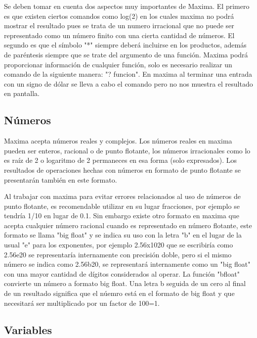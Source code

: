 \documentclass{article} %
\begin{document}
\vspace{0.5 cm}

Se deben tomar en cuenta dos aspectos muy importantes de Maxima. El primero es que existen ciertos comandos como log(2) en los cuales maxima no podrá mostrar el resultado pues se trata de un numero irracional que no puede ser representado como un número finito con una cierta cantidad de números. El segundo es que el símbolo "*" siempre deberá incluirse en los productos, además de paréntesis siempre que se trate del argumento de una función. Maxima podrá proporcionar información de cualquier función, solo es necesario realizar un comando de la siguiente manera: "? funcion". En maxima al terminar una entrada con un signo de dólar se lleva a cabo el comando pero no nos muestra el resultado en pantalla. 

\subsection{Números}

Maxima acepta números reales y complejos. Los números reales en maxima pueden ser enteros, racional o de punto flotante, los números irracionales como lo es raíz de 2 o logaritmo de 2 permaneces en esa forma (solo expresados). Los resultados de operaciones hechas con números en formato de punto flotante se presentarán también en este formato. 

\vspace{0.5 cm}

Al trabajar con maxima para evitar errores relacionados al uso de números de punto flotante, es recomendable utilizar en su lugar fracciones, por ejemplo se tendría 1/10 en lugar de 0.1. Sin embargo existe otro formato en maxima que acepta cualquier número racional cuando es representado en número flotante, este formato se llama "big float" y se indica su uso con la letra "b" en el lugar de la usual "e" para los exponentes, por ejemplo 2.56x1020 que se escribiría como 2.56e20 se representaría internamente con precisión doble, pero si el mismo número se indica como 2.56b20, se representará internamente como un "big float" con una mayor cantidad de dígitos considerados al operar. La función "bfloat" convierte un número a formato big float. Una letra b seguida de un cero al final de un resultado significa que el núemro está en el formato de big float y que necesitará ser multiplicado por un factor de 100=1. 

\subsection{Variables}
\end{document}
